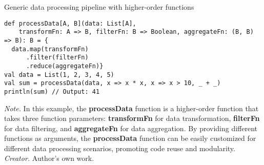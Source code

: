 \begin{table}[h!]
\caption{Generic data processing pipeline with higher-order functions}
\begin{lstlisting}
def processData[A, B](data: List[A],
    transformFn: A => B, filterFn: B => Boolean, aggregateFn: (B, B) => B): B = {
  data.map(transformFn)
      .filter(filterFn)
      .reduce(aggregateFn)}
val data = List(1, 2, 3, 4, 5)
val sum = processData(data, x => x * x, x => x > 10, _ + _)
println(sum) // Output: 41
\end{lstlisting}
\small
\textit{Note.} In this example, the \textbf{processData} function is a higher-order function that takes three function parameters: \textbf{transformFn} for data transformation, \textbf{filterFn} for data filtering, and \textbf{aggregateFn} for data aggregation. By providing different functions as arguments, the \textbf{processData} function can be easily customized for different data processing scenarios, promoting code reuse and modularity.
\textit{Creator.} Author's own work.
\end{table}